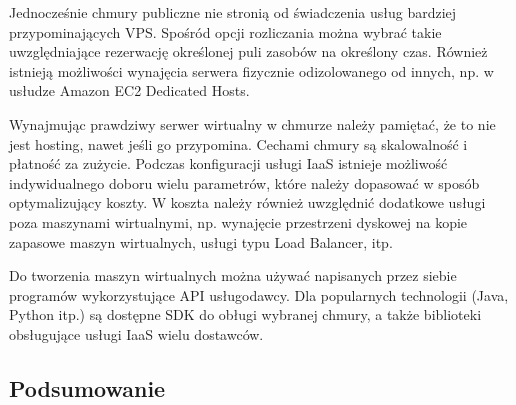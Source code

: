 \documentclass[12pt,a4paper,twoside,titlepage,openright]{book}
\begin{document}
Jednocześnie chmury publiczne nie stronią od świadczenia usług bardziej przypominających VPS. Spośród opcji rozliczania można wybrać takie uwzględniające rezerwację określonej puli zasobów na określony czas. Również istnieją możliwości wynajęcia serwera fizycznie odizolowanego od innych, np. w usłudze Amazon EC2 Dedicated Hosts.

Wynajmując prawdziwy serwer wirtualny w chmurze należy pamiętać, że to nie jest hosting, nawet jeśli go przypomina. Cechami chmury są skalowalność i płatność za zużycie. Podczas konfiguracji usługi IaaS istnieje możliwość indywidualnego doboru wielu parametrów, które należy dopasować w sposób optymalizujący koszty. W koszta należy również uwzględnić dodatkowe usługi poza maszynami wirtualnymi, np. wynajęcie przestrzeni dyskowej na kopie zapasowe maszyn wirtualnych, usługi typu Load Balancer, itp.

Do tworzenia maszyn wirtualnych można używać napisanych przez siebie programów wykorzystujące API usługodawcy. Dla popularnych technologii (Java, Python itp.) są dostępne SDK do obługi wybranej chmury, a także biblioteki obsługujące usługi IaaS wielu dostawców.

\subsection*{Podsumowanie}
\end{document}
